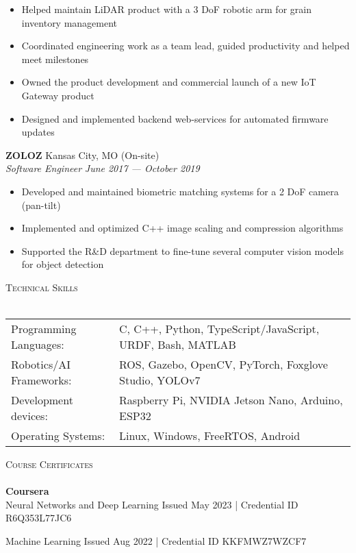 \documentclass[a4paper]{article}
\newcommand{\lineunder} {
    \vspace*{-8pt} \\
    \hspace*{-18pt} \hrulefill \\
}
\newcommand{\header} [1] {
    {\hspace*{-18pt}\vspace*{6pt} \textsc{#1}}
    \vspace*{-6pt} \lineunder
}
\begin{document}
\begin{itemize} \itemsep 1pt
	\item Helped maintain LiDAR product with a 3 DoF robotic arm for grain inventory management
	\item Coordinated engineering work as a team lead, guided productivity and helped meet milestones
	\item Owned the product development and commercial launch of a new IoT Gateway product
	\item Designed and implemented backend web-services for automated firmware updates
\end{itemize}
\textbf{ZOLOZ} \hfill Kansas City, MO (On-site)\\
\textit{Software Engineer} \hfill \textit{June 2017 --- October 2019}\\
\vspace{-1mm}
\begin{itemize} \itemsep 1pt
	\item Developed and maintained biometric matching systems for a 2 DoF camera (pan-tilt)
	\item Implemented and optimized C++ image scaling and compression algorithms
	\item Supported the R\&D department to fine-tune several computer vision models for object detection
\end{itemize}

\header{Technical Skills}
\vspace{2mm}
\begin{tabular}{ l l }
	Programming Languages: & C, C++, Python, TypeScript/JavaScript, URDF, Bash, MATLAB \\
    Robotics/AI Frameworks:   & ROS, Gazebo, OpenCV, PyTorch, Foxglove Studio, YOLOv7 \\
    Development devices:   & Raspberry Pi, NVIDIA Jetson Nano, Arduino, ESP32 \\
    Operating Systems:     & Linux, Windows, FreeRTOS, Android \\
\end{tabular}
\vspace{5mm}

\header{Course Certificates}
{\textbf{Coursera}}\\
\vspace{1.75mm}
Neural Networks and Deep Learning \hfill Issued May 2023 | \footnotesize{Credential ID R6Q353L77JC6}

\normalsize{}

\vspace{1mm}
Machine Learning \hfill Issued Aug 2022 | \footnotesize{Credential ID KKFMWZ7WZCF7}
\end{document}
